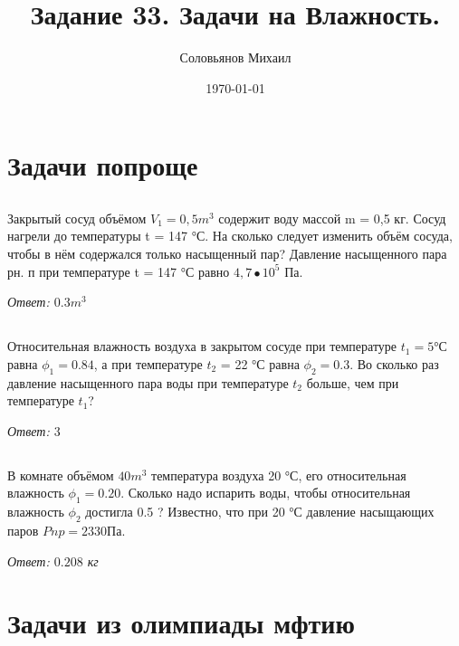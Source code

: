 \documentclass[a4paper,12pt]{article} %
\author{Соловьянов Михаил }
\title{Задание 33. Задачи на Влажность.}
\date{\today}
\begin{document}
\maketitle

\section{Задачи попроще}
\subsection{}
Закрытый сосуд объёмом $ V_1 = 0,5 m^3 $ содержит воду массой m = 0,5 кг. Сосуд нагрели до температуры t = 147 °С. На сколько следует изменить объём сосуда, чтобы в нём содержался только насыщенный пар? Давление насыщенного пара рн. п при температуре t = 147 °С равно $4,7 • 10^5$ Па.

\textit{Ответ: $0.3 m^3$}

\subsection{}
 Относительная влажность воздуха в закрытом сосуде при температуре $t_1 = 5$°С равна $\phi_1 = 0.84$, а при температуре $t_2$ = 22 °С равна $\phi_2 = 0.3 $. Во сколько раз давление насыщенного пара воды при температуре $t_2$ больше, чем при температуре $t_1$?


\textit{Ответ: $3$}


\subsection{}

В комнате объёмом $40 m^3$ температура воздуха 20 °С, его относительная влажность $\phi_1 = 0.20$. Сколько надо испарить воды, чтобы относительная влажность $\phi_2$ достигла 0.5 ? Известно, что при 20 °С давление насыщающих паров $Pnp = 2330 $Па.

\textit{Ответ: $0.208$ кг}

\newpage
\section{ Задачи из олимпиады мфтию }
\end{document}
